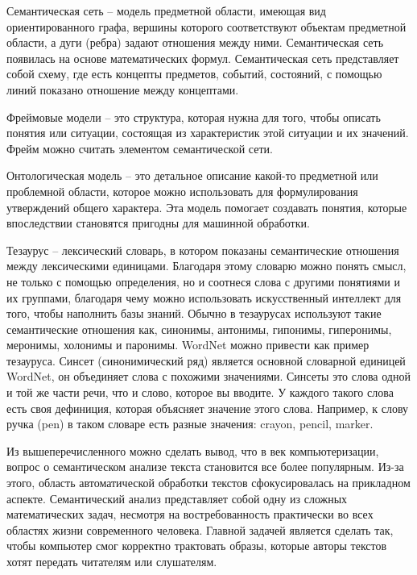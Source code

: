 Семантическая сеть – модель предметной области, имеющая вид
ориентированного графа, вершины которого соответствуют объектам
предметной области, а дуги (ребра) задают отношения между ними.
Семантическая сеть появилась на основе математических формул. Семантическая сеть представляет собой схему, где есть концепты предметов, событий, состояний, с помощью линий показано отношение между
концептами.


Фреймовые модели – это структура, которая нужна для того, чтобы
описать понятия или ситуации, состоящая из характеристик этой ситуации и их значений. Фрейм можно считать элементом семантической
сети.

Онтологическая модель – это детальное описание какой-то предметной или проблемной области, которое можно использовать для
формулирования утверждений общего характера. Эта модель помогает
создавать понятия, которые впоследствии становятся пригодны для машинной обработки.

Тезаурус – лексический словарь, в котором показаны семантические отношения между лексическими единицами.
Благодаря этому словарю можно понять смысл, не только с помощью определения, но и соотнеся слова с другими понятиями и их группами, 
благодаря чему можно использовать искусственный интеллект для того, чтобы наполнить базы знаний. 
Обычно в тезаурусах используют такие семантические
отношения как, синонимы, антонимы, гипонимы, гиперонимы, меронимы, холонимы и паронимы. 
WordNet можно привести как пример тезауруса. 
Синсет (синонимический ряд) является основной словарной единицей WordNet, 
он объединяет слова с похожими значениями. Синсеты
это слова одной и той же части речи, что и слово, которое вы вводите. У
каждого такого слова есть своя дефиниция, которая объясняет значение
этого слова. Например, к слову ручка (pen) в таком словаре есть разные
значения: crayon, pencil, marker.

Из вышеперечисленного можно сделать вывод, что в век компьютеризации, 
вопрос о семантическом анализе текста становится все более
популярным. Из-за этого, область автоматической обработки текстов
сфокусировалась на прикладном аспекте. Семантический анализ представляет 
собой одну из сложных математических задач, несмотря на
востребованность практически во всех областях жизни современного
человека. Главной задачей является сделать так, чтобы компьютер смог
корректно трактовать образы, которые авторы текстов хотят передать
читателям или слушателям. 

